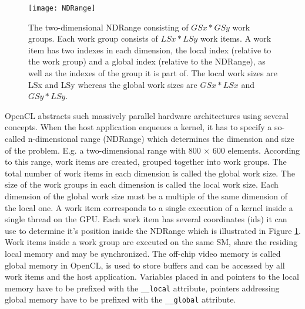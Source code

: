 \begin{figure} 
\centering
\texttt{[image: NDRange]}
\caption{The two-dimensional NDRange consisting of $GSx * GSy$ work groups. Each work group consists of $LSx * LSy$ work items. A work item has two indexes in each dimension, the local index (relative to the work group) and a global index (relative to the NDRange), as well as the indexes of the group it is part of. The local work sizes are LSx and LSy whereas the global work sizes are $GSx * LSx$ and $GSy * LSy$.}
\label{fig:NDRange}
\end{figure}

OpenCL abstracts such massively parallel hardware architectures using several concepts. When the host application enqueues a kernel, it has to specify a so-called n-dimensional range (NDRange) which determines the dimension and size of the problem. E.g. a two-dimensional range with 800 $\times$ 600 elements. According to this range, work items are created, grouped together into work groups. The total number of work items in each dimension is called the global work size. The size of the work groups in each dimension is called the local work size. Each dimension of the global work size must be a multiple of the same dimension of the local one. A work item corresponds to a single execution of a kernel inside a single thread on the GPU. Each work item has several coordinates (ids) it can use to determine it's position inside the NDRange which is illustrated in  Figure \ref{fig:NDRange}. Work items inside a work group are executed on the same SM, share the residing local memory and may be synchronized. The off-chip video memory is called global memory in OpenCL, is used to store buffers and can be accessed by all work items and the host application. Variables placed in and pointers to the local memory have to be prefixed with the \lstinline!__local! attribute, pointers addressing global memory have to be prefixed with the \lstinline!__global! attribute.
